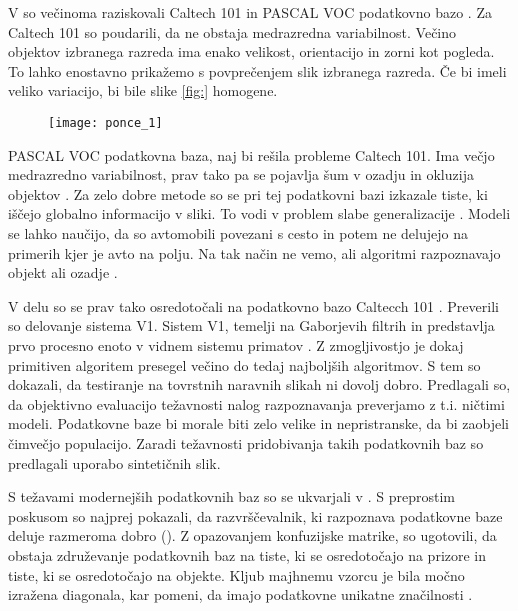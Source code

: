 V \cite{ponce2006dataset} so večinoma raziskovali Caltech 101 \cite{fei2007learning} in PASCAL VOC podatkovno bazo \cite{?}. Za Caltech 101 so poudarili, da ne obstaja medrazredna variabilnost. Večino objektov izbranega razreda ima enako velikost, orientacijo in zorni kot pogleda. To lahko enostavno prikažemo s povprečenjem slik izbranega razreda. Če bi imeli veliko variacijo, bi bile slike \ref{fig:} homogene.

\begin{figure}[!htbp]
	\centering
	\texttt{[image: ponce\_1]}
	\caption{}
\end{figure}

PASCAL VOC podatkovna baza, naj bi rešila probleme Caltech 101. Ima večjo medrazredno variabilnost, prav tako pa se pojavlja šum v ozadju in okluzija objektov \cite{ponce2006dataset}. Za zelo dobre metode so se pri tej podatkovni bazi izkazale tiste, ki iščejo globalno informacijo v sliki. To vodi v problem slabe generalizacije \cite{ponce2006dataset}. Modeli se lahko naučijo, da so avtomobili povezani s cesto in potem ne delujejo na primerih kjer je avto na polju. Na tak način ne vemo, ali algoritmi razpoznavajo objekt ali ozadje \cite{ponce2006dataset}.

V delu \cite{pinto2008why} so se prav tako osredotočali na podatkovno bazo Caltecch 101 \cite{fei2007learning}. Preverili so delovanje sistema V1. Sistem V1, temelji na Gaborjevih filtrih in predstavlja prvo procesno enoto v vidnem sistemu primatov \cite{pinto2008why}. Z zmogljivostjo  je dokaj primitiven algoritem presegel večino do tedaj najboljših algoritmov. S tem so dokazali, da testiranje na tovrstnih naravnih slikah ni dovolj dobro. Predlagali so, da objektivno evaluacijo težavnosti nalog razpoznavanja preverjamo z t.i. ničtimi modeli. Podatkovne baze bi morale biti zelo velike in nepristranske, da bi zaobjeli čimvečjo populacijo. Zaradi težavnosti pridobivanja takih podatkovnih baz so predlagali uporabo sintetičnih slik.

S težavami modernejših podatkovnih baz so se ukvarjali v \cite{torralba2011unbiased}. S preprostim poskusom so najprej pokazali, da razvrščevalnik, ki razpoznava podatkovne baze deluje razmeroma dobro (). Z opazovanjem konfuzijske matrike, so ugotovili, da obstaja združevanje podatkovnih baz na tiste, ki se osredotočajo na prizore in tiste, ki se osredotočajo na objekte. Kljub majhnemu vzorcu je bila močno izražena diagonala, kar pomeni, da imajo podatkovne unikatne značilnosti \cite{torralba2011unbiased}. 

